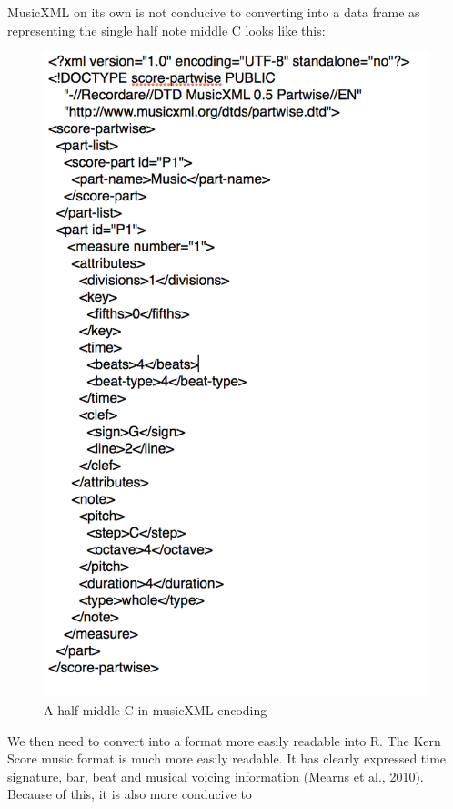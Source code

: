 \documentclass[12pt,twoside]{reedthesis}
\theoremstyle{definition}
\theoremstyle{definition}
\theoremstyle{definition}
\theoremstyle{remark}
\begin{document}
MusicXML on its own is not conducive to converting into a data frame as
representing the single half note middle C looks like this:
\begin{figure}[h]
\centering
\includegraphics[scale=.30]{images/mxlc.png}
\caption{A half middle C in musicXML encoding}
\label{subd}
\end{figure}
We then need to convert into a format more easily readable into R. The
Kern Score music format is much more easily readable. It has clearly
expressed time signature, bar, beat and musical voicing information
(Mearns et al., 2010). Because of this, it is also more conducive to
\end{document}
